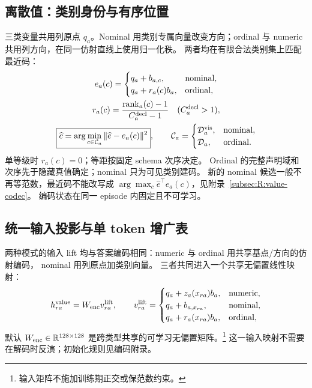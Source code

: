 \documentclass[11pt,UTF8,fontset=fandol]{ctexart}
\numberwithin{equation}{section}
\theoremstyle{definition}
\newcommand{\R}{\mathbb R}
\begin{document}
\subsection{离散值：类别身份与有序位置}
三类变量共用列原点 $q_a$。Nominal 用类别专属向量改变方向；ordinal 与 numeric 共用列方向，在同一仿射直线上使用归一化秩。
两者均在有限合法类别集上匹配最近码：
\begin{equation}
 \begin{gathered}
 e_a(c)=\begin{cases}q_a+b_{a,c},&\text{nominal},\\q_a+r_a(c)b_a,&\text{ordinal},\end{cases}\\
 r_a(c)=\frac{\operatorname{rank}_a(c)-1}{C_a^{\rm decl}-1}\quad(C_a^{\rm decl}>1),\\
 \boxed{\widehat c=\arg\min_{c\in\mathcal C_a}\|\widehat e-e_a(c)\|^2},\qquad
 \mathcal C_a=\begin{cases}\mathcal D_a^{\rm vis},&\text{nominal},\\\mathcal D_a,&\text{ordinal}.\end{cases}
 \end{gathered}
 \label{v53:eq:discrete-codec}
\end{equation}
单等级时 $r_a(c)=0$；等距按固定 schema 次序决定。
Ordinal 的完整声明域和次序先于隐藏真值确定；nominal 只为可见类别建码。
新的 nominal 候选一般不再等范数，最近码不能改写成 $\arg\max_c\widehat e^\top e_a(c)$，见附录~\ref{subsec:R:value-codec}。
编码状态在同一 episode 内固定且不可学习。

\subsection{统一输入投影与单 token 增广表}
\label{subsec:E:value-codec}
两种模式的输入 lift 均与答案编码相同：numeric 与 ordinal 用共享基点/方向的仿射编码，
nominal 用列原点加类别向量。
三者共同进入一个共享无偏置线性映射：
\begin{equation}
 h_{ra}^{\rm value}=W_{\rm enc}v_{ra}^{\rm lift},\qquad
 v_{ra}^{\rm lift}=\begin{cases}
 q_a+z_a(x_{ra})b_a,&\text{numeric},\\
 q_a+b_{a,x_{ra}},&\text{nominal},\\
 q_a+r_a(x_{ra})b_a,&\text{ordinal},
 \end{cases}
 \label{v53:eq:input-lift}
\end{equation}
默认 $W_{\rm enc}\in\R^{128\times128}$ 是跨类型共享的可学习无偏置矩阵。\footnote{输入矩阵不施加训练期正交或保范数约束。}
这一输入映射不需要在解码时反演；初始化规则见编码附录。
\end{document}
